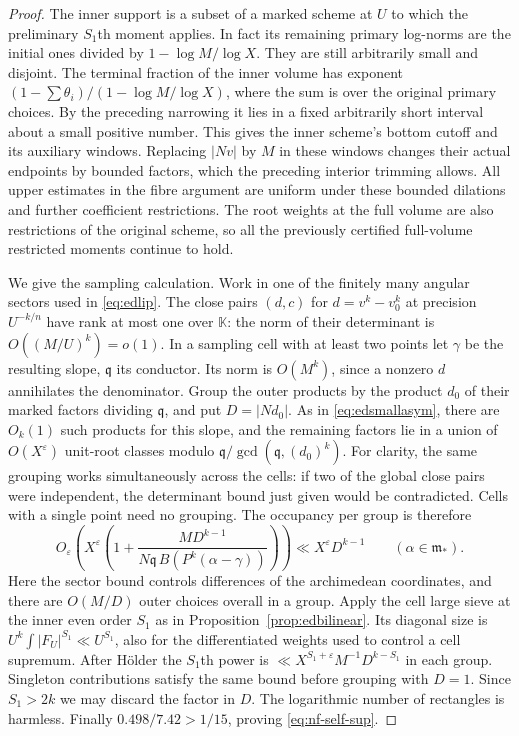 \documentclass[11pt,letterpaper]{article}
\theoremstyle{definition}
\numberwithin{equation}{section}
\begin{document}
\begin{proof}
The inner support is a subset of a marked scheme at $U$ to which
the preliminary $S_1$th moment applies. In fact its remaining
primary log-norms are the initial ones divided by
$1-\log M/\log X$. They are still arbitrarily small and disjoint.
The terminal fraction of the inner volume has exponent
$(1-\sum\theta_i)/(1-\log M/\log X)$, where the sum is over the
original primary choices. By the preceding narrowing it lies in a
fixed arbitrarily short interval about a small positive number.
This gives the inner scheme's bottom cutoff and its auxiliary
windows. Replacing $|Nv|$ by $M$ in these windows changes their actual
endpoints by bounded factors, which the preceding interior trimming
allows. All upper estimates in the fibre argument are uniform under
these bounded dilations and further coefficient restrictions.
The root weights at the full volume are also restrictions of the
original scheme, so all the previously certified full-volume
restricted moments continue to hold.

We give the sampling calculation. Work in one of the finitely
many angular sectors used in \eqref{eq:edlip}. The close pairs
$(d,c)$ for $d=v^k-v_0^k$ at precision $U^{-k/n}$ have rank at
most one over $\mathbb K$: the norm of their determinant is
$O((M/U)^k)=o(1)$. In a sampling cell with at least two points
let $\gamma$ be the resulting slope, $\mathfrak q$ its conductor.
Its norm is $O(M^k)$, since a nonzero $d$ annihilates the
denominator. Group the outer products by the product $d_0$ of
their marked factors dividing $\mathfrak q$, and put $D=|Nd_0|$.
As in \eqref{eq:edsmallasym}, there are $O_k(1)$ such products
for this slope, and the remaining factors lie in a union of
$O(X^\varepsilon)$ unit-root classes modulo
$\mathfrak q/\gcd(\mathfrak q,(d_0)^k)$. For clarity, the same
grouping works simultaneously across the cells: if two of the
global close pairs were independent, the determinant bound just
given would be contradicted. Cells with a single point need no
grouping. The occupancy per group is therefore
\[
  O_\varepsilon\!\left(X^\varepsilon
       \left(1+\frac{M D^{k-1}}
          {N\mathfrak q\, B(P^k(\alpha-\gamma))}\right)\right)
       \ll X^\varepsilon D^{k-1}
           \qquad(\alpha\in\mathfrak m_*).
\]
Here the sector bound controls differences of the archimedean
coordinates, and there are $O(M/D)$ outer choices overall in a
group. Apply the cell large sieve at the inner even order $S_1$
as in Proposition~\ref{prop:edbilinear}. Its diagonal size is
$U^k\int|F_U|^{S_1}\ll U^{S_1}$, also for the differentiated
weights used to control a cell supremum. After H\"older the
$S_1$th power is
$\ll X^{S_1+\varepsilon}M^{-1}D^{k-S_1}$ in each group.
Singleton contributions satisfy the same bound before grouping
with $D=1$. Since $S_1>2k$ we may discard the factor in $D$.
The logarithmic number of rectangles is harmless. Finally
$0.498/7.42>1/15$, proving \eqref{eq:nf-self-sup}.


\end{proof}
\end{document}
